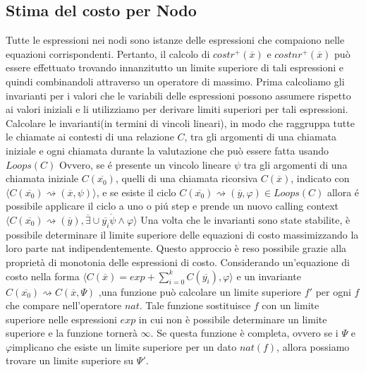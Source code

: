 \documentclass[../../main.tex]{subfiles}
\begin{document}
\subsection{Stima del costo per Nodo}
Tutte le espressioni nei nodi sono istanze delle espressioni che compaiono nelle equazioni corrispondenti. Pertanto, il calcolo di $costr^+(\overline{x})$ e $costnr^+(\overline{x})$ può essere effettuato trovando innanzitutto un limite superiore di tali espressioni e quindi combinandoli attraverso un operatore di massimo. Prima calcoliamo gli invarianti per i valori che le variabili delle espressioni possono assumere rispetto ai valori iniziali e li utilizziamo per derivare limiti superiori per tali espressioni.\\
Calcolare le invarianti(in termini di vincoli lineari), in modo che raggruppa tutte le chiamate ai contesti di una relazione $C$, tra gli argomenti di una chiamata iniziale e ogni chiamata durante la valutazione che può essere fatta usando $Loops(C)$
Ovvero, se é presente un vincolo lineare $\psi$ tra gli argomenti di una chiamata iniziale $C(\overline{x_0})$, quelli di una chiamata ricorsiva $C(\overline{x})$, indicato con $\langle C(\overline{x_0})\rightsquigarrow  (\overline{x}, \psi)\rangle$, e se esiste il ciclo $C(\overline{x_0}) \rightsquigarrow (\overline{y},\varphi)\in Loops(C)$ allora é possibile applicare il ciclo a uno o piú step e prende un nuovo calling context $\langle C(\overline{x_0})  \rightsquigarrow (\overline{y}), \overline{\exists} \cup \overline{y_i}\dot \psi \land \varphi\rangle$
Una volta che le invarianti sono state stabilite, è possibile determinare il limite superiore delle equazioni di costo massimizzando la loro parte nat indipendentemente. Questo approccio è reso possibile grazie alla proprietà di monotonia delle espressioni di costo. Considerando un'equazione di costo nella forma $\langle  C(\overline{x}) = exp + \sum_{i=0}^k C(\overline{y_i}), \varphi \rangle$ e un invariante $C(\overline{x_0})\rightsquigarrow C(\overline{x}, \varPsi) $ ,una funzione può calcolare un limite superiore $f'$ per ogni $f$ che compare nell'operatore $nat$. Tale funzione sostituisce $f$ con un limite superiore nelle espressioni $exp$ in cui non è possibile determinare un limite superiore e la funzione tornerà $\infty$. Se questa funzione è completa, ovvero se i $\varPsi$ e $\varphi$implicano che esiste un limite superiore per un dato $nat(f)$, allora possiamo trovare un limite superiore su $\varPsi '$.\\
\autocite{amslaurea3135}
\end{document}
